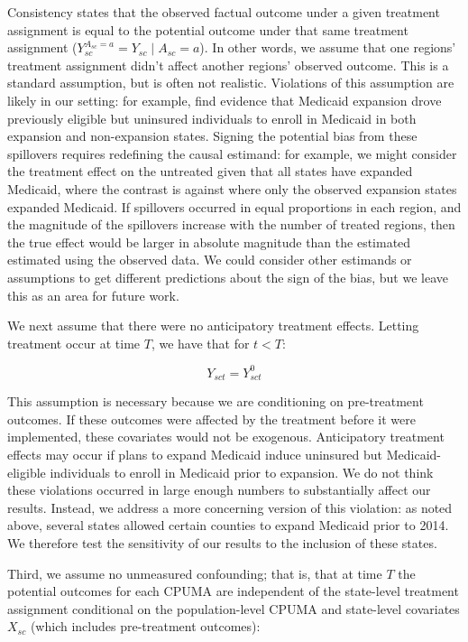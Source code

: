\documentclass[12pt]{article}
\begin{document}
Consistency states that the observed factual outcome under a given treatment assignment is equal to the potential outcome under that same treatment assignment ($Y_{sc}^{A_{sc} = a} = Y_{sc} \mid A_{sc} = a$). In other words, we assume that one regions' treatment assignment didn't affect another regions' observed outcome. This is a standard assumption, but is often not realistic. Violations of this assumption are likely in our setting: for example, \cite{frean2017premium} find evidence that Medicaid expansion drove previously eligible but uninsured individuals to enroll in Medicaid in both expansion and non-expansion states. Signing the potential bias from these spillovers requires redefining the causal estimand: for example, we might consider the treatment effect on the untreated given that all states have expanded Medicaid, where the contrast is against where only the observed expansion states expanded Medicaid. If spillovers occurred in equal proportions in each region, and the magnitude of the spillovers increase with the number of treated regions, then the true effect would be larger in absolute magnitude than the estimated estimated using the observed data. We could consider other estimands or assumptions to get different predictions about the sign of the bias, but we leave this as an area for future work.

We next assume that there were no anticipatory treatment effects. Letting treatment occur at time $T$, we have that for $t < T$:

$$
Y_{sct} = Y_{sct}^0
$$

This assumption is necessary because we are conditioning on pre-treatment outcomes. If these outcomes were affected by the treatment before it were implemented, these covariates would not be exogenous. Anticipatory treatment effects may occur if plans to expand Medicaid induce uninsured but Medicaid-eligible individuals to enroll in Medicaid prior to expansion. We do not think these violations occurred in large enough numbers to substantially affect our results. Instead, we address a more concerning version of this violation: as noted above, several states allowed certain counties to expand Medicaid prior to 2014. We therefore test the sensitivity of our results to the inclusion of these states.

Third, we assume no unmeasured confounding; that is, that at time $T$ the potential outcomes for each CPUMA are independent of the state-level treatment assignment conditional on the population-level CPUMA and state-level covariates $X_{sc}$ (which includes pre-treatment outcomes):
\end{document}
